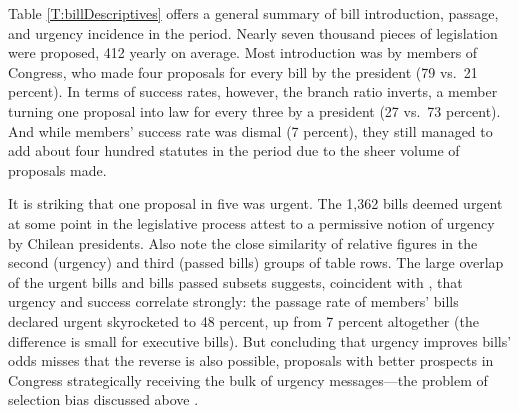 \documentclass[letter,12pt]{article}
\begin{document}
Table \ref{T:billDescriptives} offers a general summary of bill introduction, passage, and urgency incidence in the period. Nearly seven thousand pieces of legislation were proposed, 412 yearly on average. Most introduction was by members of Congress, who made four proposals for every bill by the president (79 vs.\ 21 percent). In terms of success rates, however, the branch ratio inverts, a member turning one proposal into law for every three by a president (27 vs.\ 73 percent). And while members' success rate was dismal (7 percent), they still managed to add about four hundred statutes in the period due to the sheer volume of proposals made. 

It is striking that one proposal in five was urgent. The 1,362 bills deemed urgent at some point in the legislative process attest to a permissive notion of urgency by Chilean presidents. Also note the close similarity of relative figures in the second (urgency) and third (passed bills) groups of table rows. The large overlap of the urgent bills and bills passed subsets suggests, coincident with \citet{aleman.navia.UrgChi.2009}, that urgency and success correlate strongly: the passage rate of members' bills declared urgent skyrocketed to 48 percent, up from 7 percent altogether (the difference is small for executive bills). But concluding that urgency improves bills' odds misses that the reverse is also possible, proposals with better prospects in Congress strategically receiving the bulk of urgency messages---the problem of selection bias discussed above \citep[cf.][]{jacobson.kernell.1983}. 
\end{document}
